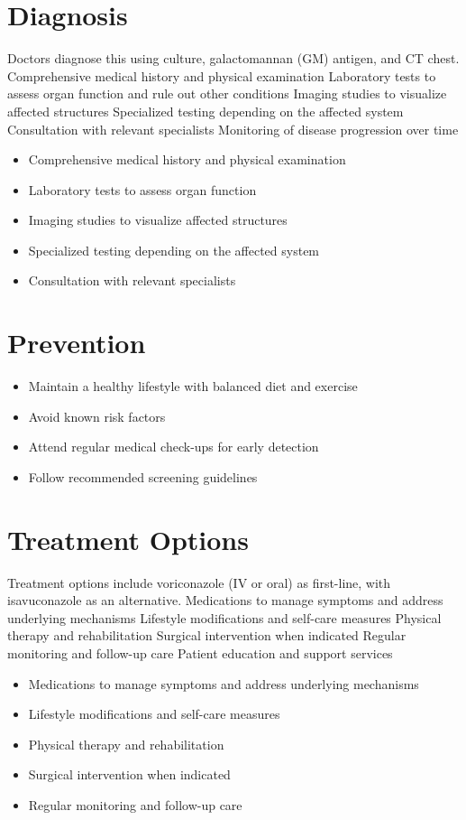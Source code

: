 \section{Diagnosis}
Doctors diagnose this using culture, galactomannan (GM) antigen, and CT chest. Comprehensive medical history and physical examination Laboratory tests to assess organ function and rule out other conditions Imaging studies to visualize affected structures Specialized testing depending on the affected system Consultation with relevant specialists Monitoring of disease progression over time

\begin{itemize}[noitemsep]
  \item Comprehensive medical history and physical examination
  \item Laboratory tests to assess organ function
  \item Imaging studies to visualize affected structures
  \item Specialized testing depending on the affected system
  \item Consultation with relevant specialists
\end{itemize}
\section{Prevention}
\begin{itemize}[noitemsep]
  \item Maintain a healthy lifestyle with balanced diet and exercise
  \item Avoid known risk factors
  \item Attend regular medical check-ups for early detection
  \item Follow recommended screening guidelines
\end{itemize}
\section{Treatment Options}
Treatment options include voriconazole (IV or oral) as first-line, with isavuconazole as an alternative. Medications to manage symptoms and address underlying mechanisms Lifestyle modifications and self-care measures Physical therapy and rehabilitation Surgical intervention when indicated Regular monitoring and follow-up care Patient education and support services

\begin{itemize}[noitemsep]
  \item Medications to manage symptoms and address underlying mechanisms
  \item Lifestyle modifications and self-care measures
  \item Physical therapy and rehabilitation
  \item Surgical intervention when indicated
  \item Regular monitoring and follow-up care
\end{itemize}
